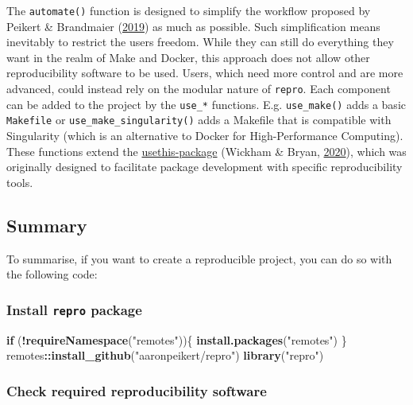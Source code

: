 \documentclass[12pt,a4paper,twoside]{article}
\newenvironment{Shaded}{\begin{snugshade}}{\end{snugshade}}
\newcommand{\ControlFlowTok}[1]{\textcolor[rgb]{0.13,0.29,0.53}{\textbf{#1}}}
\newcommand{\KeywordTok}[1]{\textcolor[rgb]{0.13,0.29,0.53}{\textbf{#1}}}
\newcommand{\NormalTok}[1]{#1}
\newcommand{\OperatorTok}[1]{\textcolor[rgb]{0.81,0.36,0.00}{\textbf{#1}}}
\newcommand{\StringTok}[1]{\textcolor[rgb]{0.31,0.60,0.02}{#1}}
\begin{document}
The \texttt{automate()} function is designed to simplify the workflow proposed by Peikert \& Brandmaier (\protect\hyperlink{ref-peikertReproducibleDataAnalysis2019}{2019}) as much as possible.
Such simplification means inevitably to restrict the users freedom.
While they can still do everything they want in the realm of Make and Docker, this approach does not allow other reproducibility software to be used.
Users, which need more control and are more advanced, could instead rely on the modular nature of \texttt{repro}.
Each component can be added to the project by the \texttt{use\_*} functions.
E.g. \texttt{use\_make()} adds a basic \texttt{Makefile} or \texttt{use\_make\_singularity()} adds a Makefile that is compatible with Singularity (which is an alternative to Docker for High-Performance Computing).
These functions extend the \href{https://usethis.r-lib.org}{usethis-package} (Wickham \& Bryan, \protect\hyperlink{ref-R-usethis}{2020}), which was originally designed to facilitate package development with specific reproducibility tools.

\hypertarget{summary}{%
\subsection{Summary}\label{summary}}

To summarise, if you want to create a reproducible project, you can do so with the following code:

\hypertarget{install-repro-package}{%
\subsubsection{\texorpdfstring{Install \texttt{repro} package}{Install repro package}}\label{install-repro-package}}

\begin{Shaded}
\begin{Highlighting}[]
\ControlFlowTok{if}\NormalTok{ (}\OperatorTok{!}\KeywordTok{requireNamespace}\NormalTok{(}\StringTok{"remotes"}\NormalTok{))\{}
  \KeywordTok{install.packages}\NormalTok{(}\StringTok{"remotes"}\NormalTok{)}
\NormalTok{\}}
\NormalTok{remotes}\OperatorTok{::}\KeywordTok{install_github}\NormalTok{(}\StringTok{"aaronpeikert/repro"}\NormalTok{)}
\KeywordTok{library}\NormalTok{(}\StringTok{"repro"}\NormalTok{)}
\end{Highlighting}
\end{Shaded}

\hypertarget{check-required-reproducibility-software}{%
\subsubsection{Check required reproducibility software}\label{check-required-reproducibility-software}}
\end{document}
